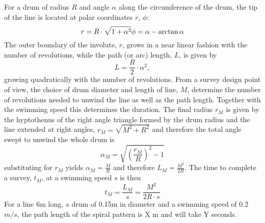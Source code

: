 For a drum of radius $R$ and angle $\alpha$ along the circumference of the drum, the tip of the line is located at polar coordinates $r$, $\phi$:  
\begin{equation}
r = R\cdot\sqrt{1+\alpha^2} \\
\phi = \alpha - \arctan{\alpha} 
\end{equation}
The outer boundary of the involute, $r$, grows in a near linear fashion with the number of revolutions, while the path (or arc) length, $L$, is given by
\begin{equation}
L=\frac{R}{2}\cdot\alpha^2,
\end{equation}
growing quadratically with the number of revolutions. 
From a survey design point of view, the choice of drum diameter and length of line, $M$, determine the number of revolutions needed to unwind the line as well as the path length. Together with the swimming speed this determines the duration. The final radius $r_M$ is given by the hyptothenus of the right angle triangle formed by the drum radius and the line extended at right angles, $r_M = \sqrt{M^2 + R^2}$ and therefore the total angle swept to unwind the whole drum is 
\begin{equation}
\alpha_M = \sqrt{\left(\frac{r_M}{R}\right)^2 - 1}
\end{equation}
substituting for $r_M$ yields $\alpha_M = \frac{M}{R}$ and therefore $L_M = \frac{M^2}{2R}$. The time to complete a survey, $t_M$, at a swimming speed $s$ is then
\begin{equation}
t_M = \frac{L_M}{s} = \frac{M^2}{2R\cdot s}
\end{equation}
For a line 6m long, a drum of 0.15m in diameter and a swimming speed of 0.2 $m/s$, the path length of the spiral pattern is X m and will take Y seconds.


    
  
  
  
  
  